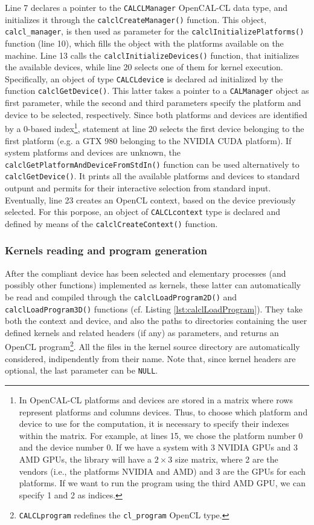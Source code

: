 Line 7 declares a pointer to the \verb'CALCLManager' OpenCAL-CL data
type, and initializes it through the \verb'calclCreateManager()'
function. This object, \verb'calcl_manager', is then used as parameter
for the \verb'calclInitializePlatforms()' function (line 10), which
fills the object with the platforms available on the machine. Line 13
calls the \verb'calclInitializeDevices()' function, that initializes
the available devices, while line 20 selects one of them for kernel
execution. Specifically, an object of type \verb'CALCLdevice' is
declared ad initialized by the function \verb'calclGetDevice()'. This
latter takes a pointer to a \verb'CALManager' object as first
parameter, while the second and third parameters specify the platform
and device to be selected, respectively. Since both platforms and
devices are identified by a 0-based index\footnote{In OpenCAL-CL
  platforms and devices are stored in a matrix where rows represent
  platforms and columns devices. Thus, to choose which platform and
  device to use for the computation, it is necessary to specify their
  indexes within the matrix. For example, at lines 15, we chose the
  platform number 0 and the device number 0. If we have a system with
  3 NVIDIA GPUs and 3 AMD GPUs, the library will have a $2 \times 3$
  size matrix, where 2 are the vendors (i.e., the platforms NVIDIA and
  AMD) and 3 are the GPUs for each platforms. If we want to run the
  program using the third AMD GPU, we can specify 1 and 2 as
  indices.}, statement at line 20 selects the first device belonging
to the first platform (e.g. a GTX 980 belonging to the NVIDIA CUDA
platform). If system platforms and devices are unknown, the
\verb'calclGetPlatformAndDeviceFromStdIn()' function can be used
alternatively to \verb'calclGetDevice()'. It prints all the available
platforms and devices to standard outpunt and permits for their
interactive selection from standard input. Eventually, line 23 creates
an OpenCL context, based on the device previously selected. For this
porpose, an object of \verb'CALCLcontext' type is declared and defined
by means of the \verb'calclCreateContext()' function.

\subsubsection{Kernels reading and program generation}

After the compliant device has been selected and elementary processes
(and possibly other functions) implemented as kernels, these latter
can automatically be read and compiled through the
\verb'calclLoadProgram2D()' and \verb'calclLoadProgram3D()' functions
(cf. Listing \ref{lst:calclLoadProgram}). They take both the context
and device, and also the paths to directories containing the user
defined kernels and related headers (if any) as parameters, and
returns an OpenCL program\footnote{\texttt{CALCLprogram} redefines the
  \texttt{cl\_program} OpenCL type.}. All the files in the kernel
source directory are automatically considered, indipendently from
their name. Note that, since kernel headers are optional, the last
parameter can be \verb'NULL'.

